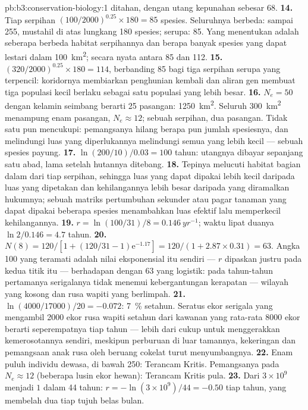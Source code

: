 \begin{solution}{pb:b3:conservation-biology:1}
ditahan, dengan utang kepunahan sebesar 68.
\textbf{14.} Tiap serpihan $(100/2000)^{0.25}\times 180 = 85$ spesies.
Seluruhnya berbeda: sampai 255, mustahil di atas lungkang 180 spesies;
serupa: 85. Yang menentukan adalah seberapa berbeda habitat serpihannya
dan berapa banyak spesies yang dapat lestari dalam \qty{100}{km^2}; secara
nyata antara 85 dan 112.
\textbf{15.} $(320/2000)^{0.25}\times 180 = 114$, berbanding 85 bagi tiga
serpihan serupa yang terpencil: koridornya membiarkan penghunian kembali
dan aliran gen membuat tiga populasi kecil berlaku sebagai satu populasi yang lebih besar.
\textbf{16.} $N_{e} = 50$ dengan kelamin seimbang berarti 25 pasangan: \qty{1250}{km^2}.
Seluruh \qty{300}{km^2} menampung enam pasangan, $N_{e} \approx 12$;
sebuah serpihan, dua pasangan. Tidak satu pun mencukupi: pemangsanya
hilang berapa pun jumlah spesiesnya, dan melindungi luas yang
diperlukannya melindungi semua yang lebih kecil --- sebuah spesies payung.
\textbf{17.} $\ln(200/10)/0.03 = 100$ tahun: utangnya dibayar sepanjang
satu abad, lama setelah hutannya ditebang.
\textbf{18.} Tepinya melucuti habitat bagian dalam dari tiap serpihan,
sehingga luas yang dapat dipakai lebih kecil daripada luas yang dipetakan
dan kehilangannya lebih besar daripada yang diramalkan hukumnya; sebuah
matriks pertumbuhan sekunder atau pagar tanaman yang dapat dipakai
beberapa spesies menambahkan luas efektif lalu memperkecil kehilangannya.
\textbf{19.} $r = \ln(100/31)/8 = \qty{0.146}{yr^{-1}}$; waktu lipat duanya
$\ln 2/0.146 = 4.7$ tahun.
\textbf{20.} $N(8) = 120/[1 + (120/31 - 1)\mathrm{e}^{-1.17}] = 120/(1 +
2.87\times 0.31) = 63$. Angka 100 yang teramati adalah nilai eksponensial
itu sendiri --- $r$ dipaskan justru pada kedua titik itu --- berhadapan
dengan 63 yang logistik: pada tahun-tahun pertamanya serigalanya tidak
menemui kebergantungan kerapatan --- wilayah yang kosong dan rusa wapiti
yang berlimpah.
\textbf{21.} $\ln(4000/\num{17000})/20 = -0.072$: \qty{7}{\%} setahun.
Seratus ekor serigala yang mengambil \num{2000} ekor rusa wapiti setahun
dari kawanan yang rata-rata \num{8000} ekor berarti seperempatnya tiap
tahun --- lebih dari cukup untuk menggerakkan kemerosotannya sendiri,
meskipun perburuan di luar tamannya, kekeringan dan pemangsaan anak rusa
oleh beruang cokelat turut menyumbangnya.
\textbf{22.} Enam puluh individu dewasa, di bawah 250: Terancam Kritis.
Pemangsanya pada $N_{e} \approx 12$ (beberapa lusin ekor hewan): Terancam
Kritis pula.
\textbf{23.} Dari $3\times 10^{9}$ menjadi $1$ dalam 44 tahun: $r = -\ln(3\times
10^{9})/44 = -0.50$ tiap tahun, yang membelah dua tiap tujuh belas bulan.

\end{solution}
